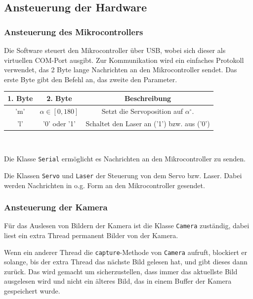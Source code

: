 \documentclass[ngerman,a4paper,parskip=half]{scrartcl}
\begin{document}
\subsection{Ansteuerung der Hardware}

\subsubsection{Ansteuerung des Mikrocontrollers}

Die Software steuert den Mikrocontroller über USB, wobei sich dieser als virtuellen COM-Port ausgibt. Zur Kommunikation wird ein einfaches Protokoll verwendet, das 2 Byte lange Nachrichten an den Mikrocontroller sendet. Das erste Byte gibt den Befehl an, das zweite den Parameter.\\

\begin{tabular}{|c|c|c|}
\hline
1. Byte & 2. Byte & Beschreibung \\
\hline
'm'\footnotemark & $\alpha \in [0,180]$ & Setzt die Servoposition auf $\alpha ^\circ$.\\
\hline
'l' & '0' oder '1' & Schaltet den Laser an ('1') bzw. aus ('0')\\
\hline
\end{tabular}\\


Die Klasse \texttt{Serial} ermöglicht es Nachrichten an den Mikrocontroller zu senden.

Die Klassen \texttt{Servo} und \texttt{Laser} der Steuerung von dem Servo bzw. Laser. Dabei werden Nachrichten in o.g. Form an den Mikrocontroller gesendet.

\subsubsection{Ansteuerung der Kamera}

Für das Auslesen von Bildern der Kamera ist die Klasse \texttt{Camera} zuständig, dabei liest ein extra Thread permanent Bilder von der Kamera.

Wenn ein anderer Thread die \texttt{capture}-Methode von \texttt{Camera} aufruft, blockiert er solange, bis der extra Thread das nächste Bild gelesen hat, und gibt dieses dann zurück. Das wird gemacht um sicherzustellen, dass immer das aktuellste Bild ausgelesen wird und nicht ein älteres Bild, das in einem Buffer der Kamera gespeichert wurde.
\end{document}
